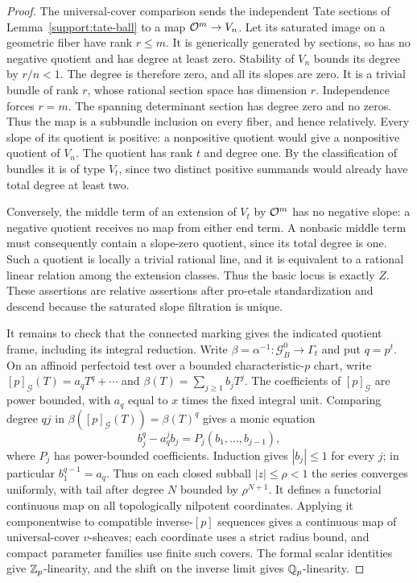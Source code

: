 \begin{proof}
The universal-cover comparison sends the independent Tate sections
of Lemma~\ref{support:tate-ball} to a map $\mathcal O^m\to V_n$.
Let its saturated image on a geometric fiber have rank $r\leq m$.
It is generically generated by sections, so has no negative
quotient and has degree at least zero.  Stability of $V_n$ bounds
its degree by $r/n<1$.  The degree is therefore zero, and all
its slopes are zero.  It is a trivial bundle of rank $r$, whose
rational section space has dimension $r$.  Independence forces
$r=m$.  The spanning determinant section has degree zero and no
zeros.  Thus the map is a subbundle inclusion on every fiber,
and hence relatively.  Every slope of its quotient is positive: a
nonpositive quotient would give a nonpositive quotient of $V_n$.
The quotient has rank $t$ and degree one.  By the classification of
bundles it is of type $V_t$, since two distinct positive summands
would already have total degree at least two.

Conversely, the middle term of an extension of $V_t$ by $\mathcal O^m$ has
no negative slope: a negative quotient receives no map from either
end term.  A nonbasic middle term must consequently contain a
slope-zero quotient, since its total degree is one.  Such a quotient
is locally a trivial rational line, and it is equivalent to a rational
linear relation among the extension classes.  Thus the basic locus
is exactly $Z$.  These assertions are relative assertions after
pro-etale standardization and descend because the saturated slope
filtration is unique.

It remains to check that the connected marking gives the indicated
quotient frame, including its integral reduction.  Write
$\beta=\alpha^{-1}:\mathcal G_B^0\to\Gamma_t$ and put $q=p^t$.
On an affinoid perfectoid test over a bounded characteristic-$p$ chart,
write $[p]_{\mathcal G}(T)=a_qT^q+\cdots$ and
$\beta(T)=\sum_{j\geq1}b_jT^j$.  The coefficients of $[p]_{\mathcal G}$
are power bounded, with $a_q$ equal to $x$ times the fixed integral unit.
Comparing degree $qj$ in
$\beta([p]_{\mathcal G}(T))=\beta(T)^q$ gives a monic equation
\[
 b_j^q-a_q^j b_j=P_j(b_1,\ldots,b_{j-1}),
\]
where $P_j$ has power-bounded coefficients.  Induction gives
$|b_j|\leq1$ for every $j$; in particular $b_1^{q-1}=a_q$.
Thus on each closed subball $|z|\leq\rho<1$ the series converges
uniformly, with tail after degree $N$ bounded by $\rho^{N+1}$.
It defines a functorial continuous map on all topologically nilpotent
coordinates.  Applying it componentwise to compatible inverse-$[p]$
sequences gives a continuous map of universal-cover $v$-sheaves;
each coordinate uses a strict radius bound, and compact parameter
families use finite such covers.  The formal scalar identities give
$\mathbb Z_p$-linearity, and the shift on the inverse limit gives $\mathbb Q_p$-linearity.


\end{proof}
